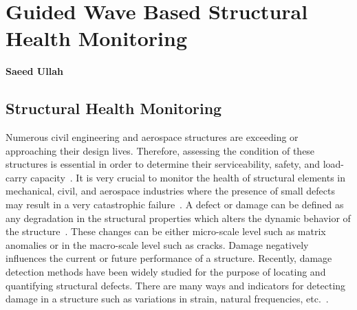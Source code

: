 \documentclass[b5paper, 11pt, titlepage]{book}
\begin{document}

\chapter{Guided Wave Based Structural Health Monitoring}
\textbf{Saeed Ullah}

\tableofcontents
\newpage
\section{Structural Health Monitoring}
Numerous civil engineering and aerospace structures are exceeding or approaching their design lives. Therefore, assessing the condition of these structures is essential in order to determine their serviceability, safety, and load-carry capacity~\cite{Farrar2007, Alampalli2007, stepinski2013advanced}. It is very crucial to monitor the health of structural elements in mechanical, civil, and aerospace industries where the presence of small defects may result in a very catastrophic failure~\cite{stepinski2013advanced}. A defect or damage can be defined as any degradation in the structural properties which alters the dynamic behavior of the structure~\cite{farrar2003damage, Farrar2012}. These changes can be either micro-scale level such as matrix anomalies or in the macro-scale level such as cracks. Damage negatively influences the current or future performance of a structure. Recently, damage detection methods have been widely studied for the purpose of locating and quantifying structural defects. There are many ways and indicators for detecting damage in a structure such as variations in strain, natural frequencies, etc.~\cite{rytter1993a}.
\end{document}
